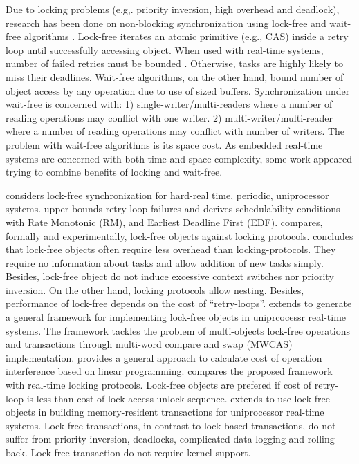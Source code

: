 \documentclass[12pt,english]{report}
\begin{document}
Due to locking problems (e,g,. priority inversion, high overhead and
deadlock), research has been done on non-blocking synchronization
using lock-free \cite{anderson96framework,563704,anderson1997lock,holman2006supporting,Lai:2009:SSR:1529282.1529660,1656921,726426,4297311,5669659}
and wait-free algorithms \cite{726426,1508449,Cho:2006:UAP:1141277.1141490,4297311,1003807,hohmuth2001pragmatic,1613351,811240,896371,896423,1203552,5953690}.
Lock-free iterates an atomic primitive (e.g., CAS) inside a retry
loop until successfully accessing object. When used with real-time
systems, number of failed retries must be bounded \cite{anderson96framework,563704}.
Otherwise, tasks are highly likely to miss their deadlines. Wait-free
algorithms, on the other hand, bound number of object access by any
operation due to use of sized buffers. Synchronization under wait-free
is concerned with: 1) single-writer/multi-readers where a number of
reading operations may conflict with one writer. 2) multi-writer/multi-reader
where a number of reading operations may conflict with number of writers.
The problem with wait-free algorithms is its space cost. As embedded
real-time systems are concerned with both time and space complexity,
some work appeared trying to combine benefits of locking and wait-free.

\cite{anderson96framework} considers lock-free synchronization for
hard-real time, periodic, uniprocessor systems. \cite{anderson96framework}
upper bounds retry loop failures and derives schedulability conditions
with Rate Monotonic (RM), and Earliest Deadline First (EDF). \cite{anderson96framework}
compares, formally and experimentally, lock-free objects against locking
protocols. \cite{anderson96framework} concludes that lock-free objects
often require less overhead than locking-protocols. They require no
information about tasks and allow addition of new tasks simply. Besides,
lock-free object do not induce excessive context switches nor priority
inversion. On the other hand, locking protocols allow nesting. Besides,
performance of lock-free depends on the cost of {}``retry-loops''.
\cite{563704} extends \cite{anderson96framework} to generate a general
framework for implementing lock-free objects in uniprcocessr real-time
systems. The framework tackles the problem of multi-objects lock-free
operations and transactions through multi-word compare and swap (MWCAS)
implementation. \cite{563704} provides a general approach to calculate
cost of operation interference based on linear programming. \cite{563704}
compares the proposed framework with real-time locking protocols.
Lock-free objects are prefered if cost of retry-loop is less than
cost of lock-access-unlock sequence. \cite{anderson1997lock} extends
\cite{anderson96framework,563704} to use lock-free objects in building
memory-resident transactions for uniprocessor real-time systems. Lock-free
transactions, in contrast to lock-based transactions, do not suffer
from priority inversion, deadlocks, complicated data-logging and rolling
back. Lock-free transaction do not require kernel support.
\end{document}
